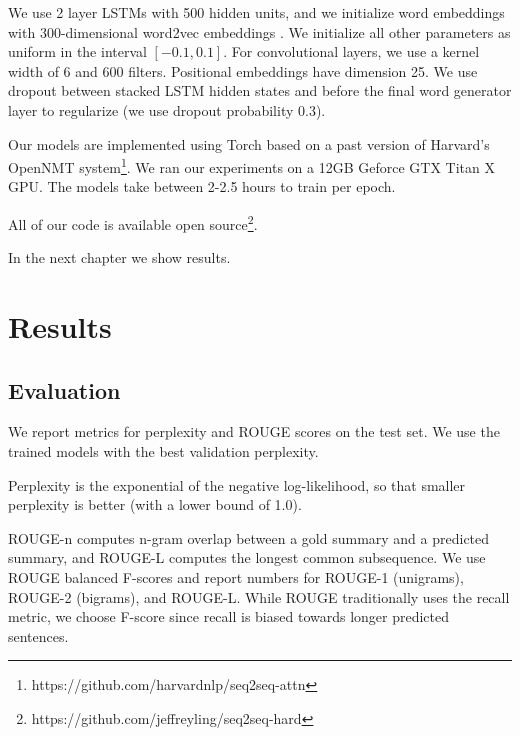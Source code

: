 \documentclass[12pt]{report}
\begin{document}
We use 2 layer LSTMs with 500 hidden units, and we initialize word embeddings with 300-dimensional word2vec embeddings \citep{mikolov2013word2vec}. We initialize all other parameters as uniform in the interval $[-0.1, 0.1]$. For convolutional layers, we use a kernel width of 6 and 600 filters. Positional embeddings have dimension 25. We use dropout \citep{Srivastava2014} between stacked LSTM hidden states and before the final word generator layer to regularize (we use dropout probability 0.3).





Our models are implemented using Torch \citep{Torch} based on a past version of Harvard's OpenNMT system\footnote{https://github.com/harvardnlp/seq2seq-attn}. We ran our experiments on a 12GB Geforce GTX Titan X GPU.
The models take between 2-2.5 hours to train per epoch.

All of our code is available open source\footnote{https://github.com/jeffreyling/seq2seq-hard}.

In the next chapter we show results.

\chapter{Results}
\label{chap:results}

\section{Evaluation}

We report metrics for perplexity and ROUGE scores \citep{lin2004rouge} on the test set. We use the trained models with the best validation perplexity.

Perplexity is the exponential of the negative log-likelihood, so that smaller perplexity is better (with a lower bound of 1.0).

ROUGE-n computes n-gram overlap between a gold summary and a predicted summary, and ROUGE-L computes the longest common subsequence.
We use ROUGE balanced F-scores and report numbers for ROUGE-1 (unigrams), ROUGE-2 (bigrams), and ROUGE-L. While ROUGE traditionally uses the recall metric, we choose F-score since recall is biased towards longer predicted sentences.
\end{document}
